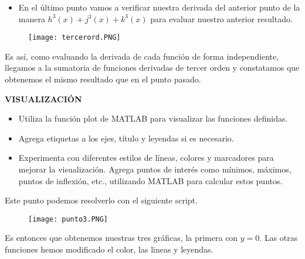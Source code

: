 \documentclass[letterpaper]{article}
\begin{document}
\vspace{\baselineskip}
\newpage
\begin{itemize}
    \item En el último punto vamos a verificar nuestra derivada del anterior punto de la manera \( h^3(x) + j^3(x) + k^3(x) \) para evaluar nuestro anterior resultado. 
\end{itemize}
\begin{figure}[H]
    \centering
    \texttt{[image: tercerord.PNG]}        
\end{figure}
\begin{justify}
    Es así, como evaluando la derivada de cada función de forma independiente, llegamos a la sumatoria de funciones derivadas de tercer orden y constatamos que obtenemos el mismo resultado que en el punto pasado.
\end{justify}

\vspace{\baselineskip}

\textbf{VISUALIZACIÓN}
\begin{itemize}
    \item Utiliza la función plot de MATLAB para visualizar las funciones definidas.
    \item Agrega etiquetas a los ejes, título y leyendas si es necesario.
    \item Experimenta con diferentes estilos de líneas, colores y marcadores para
    mejorar la visualización.
    Agrega puntos de interés como mínimos, máximos, puntos de inflexión,
etc., utilizando MATLAB para calcular estos puntos.
\end{itemize}
\vspace{\baselineskip}

\begin{justify}
    Este punto podemos resolverlo con el siguiente script.
\end{justify}

\vspace{\baselineskip}

\begin{figure}[H]
    \centering
    \texttt{[image: punto3.PNG]}        
\end{figure}

\begin{justify}
    Es entonces que obtenemos nuestras tres gráficas, la primera con \( y=0 \). Las otras funciones hemos modificado el color, las lineas y leyendas.
\end{justify}
\end{document}
